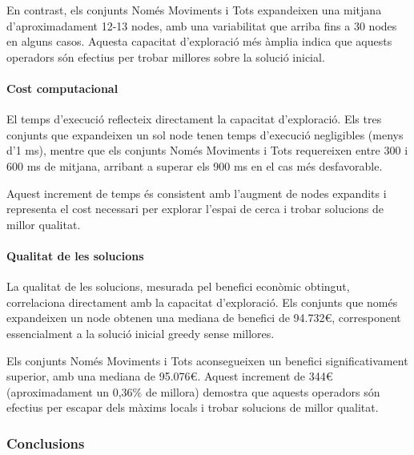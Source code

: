 En contrast, els conjunts Només Moviments i Tots expandeixen una mitjana d'aproximadament 12-13 nodes, amb una variabilitat que arriba fins a 30 nodes en alguns casos. Aquesta capacitat d'exploració més àmplia indica que aquests operadors són efectius per trobar millores sobre la solució inicial.

\paragraph{Cost computacional}

\vspace{0.5cm}

\vspace{0.5cm}

El temps d'execució reflecteix directament la capacitat d'exploració. Els tres conjunts que expandeixen un sol node tenen temps d'execució negligibles (menys d'1 ms), mentre que els conjunts Només Moviments i Tots requereixen entre 300 i 600 ms de mitjana, arribant a superar els 900 ms en el cas més desfavorable.

Aquest increment de temps és consistent amb l'augment de nodes expandits i representa el cost necessari per explorar l'espai de cerca i trobar solucions de millor qualitat.

\paragraph{Qualitat de les solucions}

\vspace{0.5cm}

\vspace{0.5cm}

La qualitat de les solucions, mesurada pel benefici econòmic obtingut, correlaciona directament amb la capacitat d'exploració. Els conjunts que només expandeixen un node obtenen una mediana de benefici de 94.732€, corresponent essencialment a la solució inicial greedy sense millores.

Els conjunts Només Moviments i Tots aconsegueixen un benefici significativament superior, amb una mediana de 95.076€. Aquest increment de 344€ (aproximadament un 0,36\% de millora) demostra que aquests operadors són efectius per escapar dels màxims locals i trobar solucions de millor qualitat.

\vspace{0.5cm}


\subsubsection{Conclusions}

